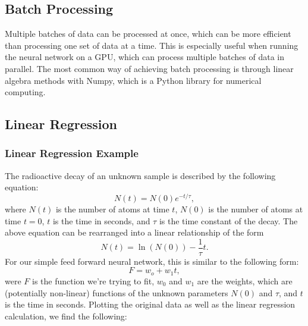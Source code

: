 \subsection{Batch Processing}

Multiple batches of data can be processed at once, which can be more efficient than processing one set of data at a time. This is especially useful when running the neural network on a GPU, which can process multiple batches of data in parallel. The most common way of achieving batch processing is through linear algebra methods with Numpy, which is a Python library for numerical computing.

\subsection{Linear Regression}
\subsubsection{Linear Regression Example}
The radioactive decay of an unknown sample is described by the following equation:
\begin{equation}
N(t) = N(0) e^{-t/\tau},
\end{equation}
where $N(t)$ is the number of atoms at time $t$, $N(0)$ is the number of atoms at time $t=0$, $t$ is the time in seconds, and $\tau$ is the time constant of the decay. The above equation can be rearranged into a linear relationship of the form 
\begin{equation}
N(t) = \ln{\left( N(0) \right)} - \frac{1}{\tau}t.
\end{equation}
For our simple feed forward neural network, this is similar to the following form:
\begin{equation}
F = w_o + w_1t,
\end{equation}
were $F$ is the function we're trying to fit, $w_0$ and $w_1$ are the weights, which are (potentially non-linear) functions of the unknown parameters $N(0)$ and $\tau$, and $t$ is the time in seconds. Plotting the original data as well as the linear regression calculation, we find the following:

